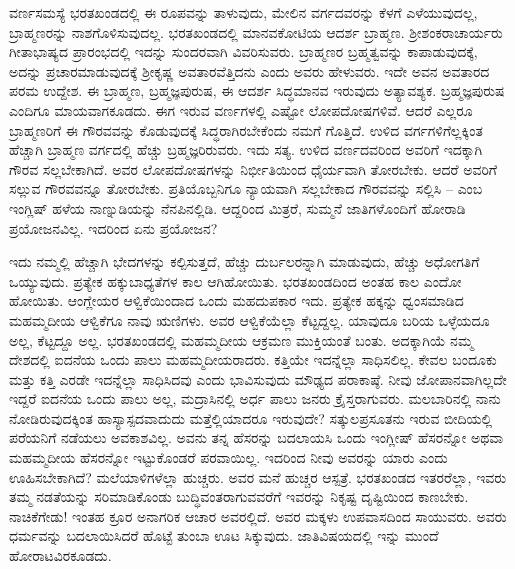 ವರ್ಣಸಮಸ್ಯೆ ಭರತಖಂಡದಲ್ಲಿ ಈ ರೂಪವನ್ನು ತಾಳುವುದು, ಮೇಲಿನ ವರ್ಗದವರನ್ನು ಕೆಳಗೆ ಎಳೆಯುವುದಲ್ಲ, ಬ್ರಾಹ್ಮಣರನ್ನು ನಾಶಗೊಳಿಸುವುದಲ್ಲ. ಭರತಖಂಡದಲ್ಲಿ ಮಾನವಕೋಟಿಯ ಆದರ್ಶ ಬ್ರಾಹ್ಮಣ. ಶ‍್ರೀಶಂಕರಾಚಾರ್ಯರು ಗೀತಾಭಾಷ್ಯದ ಪ್ರಾರಂಭದಲ್ಲಿ ಇದನ್ನು ಸುಂದರವಾಗಿ ವಿವರಿಸುವರು. ಬ್ರಾಹ್ಮಣರ ಬ್ರಹ್ಮತ್ವವನ್ನು ಕಾಪಾಡುವುದಕ್ಕೆ, ಅದನ್ನು ಪ್ರಚಾರಮಾಡುವುದಕ್ಕೆ ಶ‍್ರೀಕೃಷ್ಣ ಅವತಾರವೆತ್ತಿದನು ಎಂದು ಅವರು ಹೇಳುವರು. ಇದೇ ಅವನ ಅವತಾರದ ಪರಮ ಉದ್ದೇಶ. ಈ ಬ್ರಾಹ್ಮಣ, ಬ್ರಹ್ಮಜ್ಞಪುರುಷ, ಈ ಆದರ್ಶ ಸಿದ್ಧಮಾನವ ಇರುವುದು ಅತ್ಯಾವಶ್ಯಕ. ಬ್ರಹ್ಮಜ್ಞಪುರುಷ ಎಂದಿಗೂ ಮಾಯವಾಗಕೂಡದು. ಈಗ ಇರುವ ವರ್ಣಗಳಲ್ಲಿ ಎಷ್ಟೋ ಲೋಪದೋಷಗಳಿವೆ. ಆದರೆ ಎಲ್ಲರೂ ಬ್ರಾಹ್ಮಣರಿಗೆ ಈ ಗೌರವವನ್ನು ಕೊಡುವುದಕ್ಕೆ ಸಿದ್ಧರಾಗಿರಬೇಕೆಂದು ನಮಗೆ ಗೊತ್ತಿದೆ. ಉಳಿದ ವರ್ಗಗಳಿಗೆಲ್ಲಕ್ಕಿಂತ ಹೆಚ್ಚಾಗಿ ಬ್ರಾಹ್ಮಣ ವರ್ಗದಲ್ಲಿ ಹೆಚ್ಚು ಬ್ರಹ್ಮಜ್ಞರಿರುವರು. ಇದು ಸತ್ಯ. ಉಳಿದ ವರ್ಣದವರಿಂದ ಅವರಿಗೆ ಇದಕ್ಕಾಗಿ ಗೌರವ ಸಲ್ಲಬೇಕಾಗಿದೆ. ಅವರ ಲೋಪದೋಷಗಳನ್ನು ನಿರ್ಭೀತಿಯಿಂದ ಧೈರ್ಯವಾಗಿ ತೋರಬೇಕು. ಆದರೆ ಅವರಿಗೆ ಸಲ್ಲುವ ಗೌರವವನ್ನೂ ತೋರಬೇಕು.  ಪ್ರತಿಯೊಬ್ಬನಿಗೂ ನ್ಯಾಯವಾಗಿ ಸಲ್ಲಬೇಕಾದ ಗೌರವವನ್ನು ಸಲ್ಲಿಸಿ – ಎಂಬ ಇಂಗ್ಲಿಷ್​ ಹಳೆಯ ನಾಣ್ನುಡಿಯನ್ನು ನೆನಪಿನಲ್ಲಿಡಿ. ಆದ್ದರಿಂದ ಮಿತ್ರರೆ, ಸುಮ್ಮನೆ ಜಾತಿಗಳೊಂದಿಗೆ ಹೋರಾಡಿ ಪ್ರಯೋಜನವಿಲ್ಲ. ಇದರಿಂದ ಏನು ಪ್ರಯೋಜನ?

ಇದು ನಮ್ಮಲ್ಲಿ ಹೆಚ್ಚಾಗಿ ಭೇದಗಳನ್ನು ಕಲ್ಪಿಸುತ್ತದೆ, ಹೆಚ್ಚು ದುರ್ಬಲರನ್ನಾಗಿ ಮಾಡುವುದು, ಹೆಚ್ಚು ಅಧೋಗತಿಗೆ ಒಯ್ಯುವುದು. ಪ್ರತ್ಯೇಕ ಹಕ್ಕುಬಾಧ್ಯತೆಗಳ ಕಾಲ ಆಗಿಹೋಯಿತು. ಭರತಖಂಡದಿಂದ ಅಂತಹ ಕಾಲ ಎಂದೋ ಹೋಯಿತು. ಆಂಗ್ಲೇಯರ ಆಳ್ವಿಕೆಯಿಂದಾದ ಒಂದು ಮಹದುಪಕಾರ ಇದು. ಪ್ರತ್ಯೇಕ ಹಕ್ಕನ್ನು ಧ್ವಂಸಮಾಡಿದ ಮಹಮ್ಮದೀಯ ಆಳ್ವಿಕೆಗೂ ನಾವು ಋಣಿಗಳು. ಅವರ ಆಳ್ವಿಕೆಯೆಲ್ಲಾ ಕೆಟ್ಟದ್ದಲ್ಲ. ಯಾವುದೂ ಬರಿಯ ಒಳ್ಳೆಯದೂ ಅಲ್ಲ, ಕೆಟ್ಟದ್ದೂ ಅಲ್ಲ. ಭರತಖಂಡದಲ್ಲಿ ಮಹಮ್ಮದೀಯ ಆಕ್ರಮಣ ಮುಕ್ತಿಯಂತೆ ಬಂತು. ಅದಕ್ಕಾಗಿಯೆ ನಮ್ಮ ದೇಶದಲ್ಲಿ ಐದನೆಯ ಒಂದು ಪಾಲು ಮಹಮ್ಮದೀಯರಾದರು. ಕತ್ತಿಯೇ ಇದನ್ನೆಲ್ಲಾ ಸಾಧಿಸಲಿಲ್ಲ. ಕೇವಲ ಬಂದೂಕು ಮತ್ತು ಕತ್ತಿ ಎರಡೇ ಇದನ್ನೆಲ್ಲಾ ಸಾಧಿಸಿದವು ಎಂದು ಭಾವಿಸುವುದು ಮೌಢ್ಯದ ಪರಾಕಾಷ್ಠೆ. ನೀವು ಜೋಪಾನವಾಗಿಲ್ಲದೇ ಇದ್ದರೆ ಐದನೆಯ ಒಂದು ಪಾಲು ಅಲ್ಲ, ಮದ್ರಾಸಿನಲ್ಲಿ ಅರ್ಧ ಪಾಲು ಜನರು ಕ್ರೈಸ್ತರಾಗುವರು. ಮಲಬಾರಿನಲ್ಲಿ ನಾನು ನೋಡಿರುವುದಕ್ಕಿಂತ ಹಾಸ್ಯಾಸ್ಪದವಾದುದು ಮತ್ತೆಲ್ಲಿಯಾದರೂ ಇರುವುದೇ? ಸತ್ಕುಲಪ್ರಸೂತನು ಇರುವ ಬೀದಿಯಲ್ಲಿ ಪರೆಯನಿಗೆ ನಡೆಯಲು ಅವಕಾಶವಿಲ್ಲ. ಅವನು ತನ್ನ ಹೆಸರನ್ನು ಬದಲಾಯಸಿ ಒಂದು ಇಂಗ್ಲೀಷ್​ ಹೆಸರನ್ನೋ ಅಥವಾ ಮಹಮ್ಮದೀಯ ಹೆಸರನ್ನೋ ಇಟ್ಟುಕೊಂಡರೆ ಪರವಾಯಿಲ್ಲ. ಇದರಿಂದ ನೀವು ಅವರನ್ನು ಯಾರು ಎಂದು ಊಹಿಸಬೇಕಾಗಿದೆ? ಮಲೆಯಾಳಿಗಳೆಲ್ಲಾ ಹುಚ್ಚರು. ಅವರ ಮನೆ ಹುಚ್ಚರ ಆಸ್ಪತ್ರೆ. ಭರತಖಂಡದ ಇತರರೆಲ್ಲಾ, ಇವರು ತಮ್ಮ ನಡತೆಯನ್ನು ಸರಿಮಾಡಿಕೊಂಡು ಬುದ್ಧಿವಂತರಾಗುವವರೆಗೆ ಇವರನ್ನು ನಿಕೃಷ್ಟ ದೃಷ್ಟಿಯಿಂದ ಕಾಣಬೇಕು. ನಾಚಿಕೆಗೇಡು! ಇಂತಹ ಕ್ರೂರ ಅನಾಗರಿಕ ಆಚಾರ ಅವರಲ್ಲಿದೆ. ಅವರ ಮಕ್ಕಳು ಉಪವಾಸದಿಂದ ಸಾಯುವರು. ಅವರು ಧರ್ಮವನ್ನು ಬದಲಾಯಿಸಿದರೆ ಹೊಟ್ಟೆ ತುಂಬಾ ಊಟ ಸಿಕ್ಕುವುದು. ಜಾತಿವಿಷಯದಲ್ಲಿ ಇನ್ನು ಮುಂದೆ ಹೋರಾಟವಿರಕೂಡದು.

\vskip 4pt

